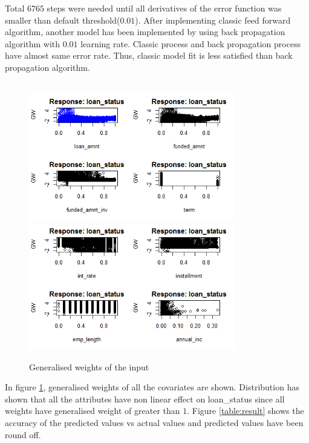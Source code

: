\documentclass{article}[]
\begin{document}
Total $6765$ steps were needed until all derivatives of the error function  was smaller than default threshold($0.01$). After implementing classic feed forward algorithm, another model has been implemented by using back propagation algorithm with $0.01$ learning rate. Classic process and back propagation process have almost same error rate. Thus, classic model fit is less satisfied than back propagation algorithm.\\\\
\begin{figure}[!htb]
\centering
\includegraphics[width=0.8\textwidth]{image3.png}
\includegraphics[width=0.8\textwidth]{image4.png}
\caption{Generalised weights of the input}
\label{fig:gw}
\end{figure}
In figure \ref{fig:gw}, generalised weights of all the covariates are shown. Distribution has shown that all the attributes have non linear effect on loan\_status since all weights have generalised weight of greater than $1$. Figure \ref{table:result} shows the accuracy of the predicted values vs actual values and predicted values have been round off.\\\\
\end{document}
